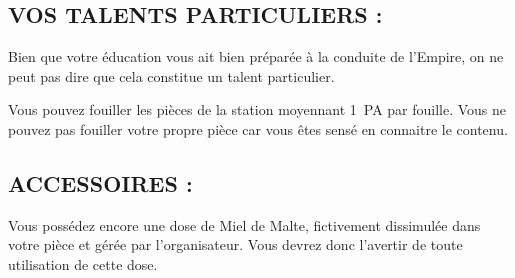 \documentclass[14pt,twocolumn]{extarticle}
\begin{document}
\subsection{VOS TALENTS PARTICULIERS :}

Bien que votre éducation vous ait bien préparée à la conduite de l'Empire, on
ne peut pas dire que cela constitue un talent particulier.

Vous pouvez fouiller les pièces de la station moyennant 1~PA par fouille. Vous
ne pouvez pas fouiller votre propre pièce car vous êtes sensé en connaitre le
contenu.

\subsection{ACCESSOIRES :}

Vous possédez encore une dose de Miel de Malte, fictivement dissimulée dans
votre pièce et gérée par l'organisateur. Vous devrez donc l'avertir de toute
utilisation de cette dose.
\end{document}
